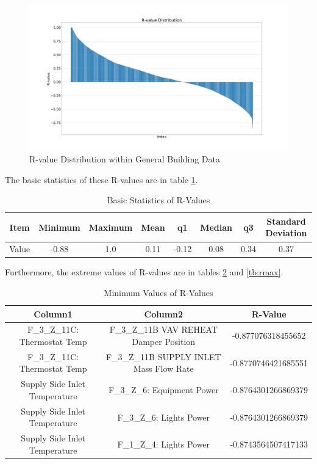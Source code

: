\documentclass[aps, 10pt, a4paper]{article}
\begin{document}
                \begin{figure}[htbp]
                    \centering
                    \includegraphics[width=0.5 \linewidth]{figures/rgeneral.png}
                    \caption{R-value Distribution within General Building Data}
                    \label{fig:rgeneral}
                \end{figure}
            
                The basic statistics of these R-values are in table \ref{tb:rgeneral}.
                
                \begin{table}[htbp]
                    \centering
                    \caption{Basic Statistics of R-Values}
                    \label{tb:rgeneral}
                    \begin{tabular}{c||c|c|c|c|c|c|c}
                        Item & Minimum & Maximum & Mean & q1 & Median & q3 & Standard Deviation \\ \hline
                        Value & -0.88 & 1.0 & 0.11 & -0.12 & 0.08 & 0.34 & 0.37 \\
                    \end{tabular}
                \end{table}
            
                Furthermore, the extreme values of R-values are in tables \ref{tb:rmin} and \ref{tb:rmax}.
                
                \begin{table}[htbp]
                    \centering
                    \caption{Minimum Values of R-Values}
                    \label{tb:rmin}
                    \begin{tabular}{c|c||c}
                        Column1 & Column2 & R-Value \\ \hline
                        F\_3\_Z\_11C: Thermostat Temp & F\_3\_Z\_11B VAV REHEAT Damper Position & -0.877076318455652 \\
                        F\_3\_Z\_11C: Thermostat Temp & F\_3\_Z\_11B SUPPLY INLET Mass Flow Rate & -0.8770746421685551 \\
                        Supply Side Inlet Temperature & F\_3\_Z\_6: Equipment Power & -0.8764301266869379 \\
                        Supply Side Inlet Temperature & F\_3\_Z\_6: Lights Power & -0.8764301266869379 \\
                        Supply Side Inlet Temperature & F\_1\_Z\_4: Lights Power & -0.8743564507417133 \\
                    \end{tabular}
                \end{table}
            
\end{document}
